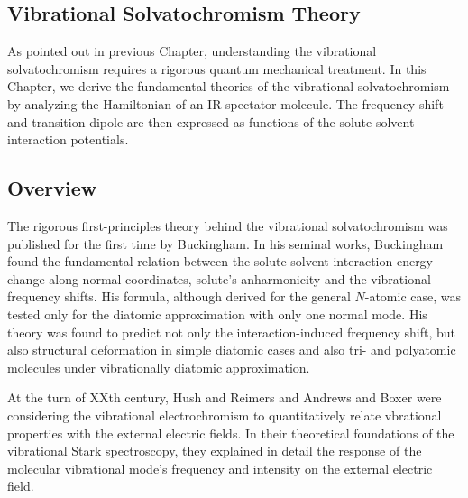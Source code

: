 \documentclass[a4paper,titlepage,twoside,fleqn,12pt]{book}
\begin{document}
\begin{refsection}
\chapter{Vibrational Solvatochromism Theory\label{c:background}}

As pointed out in previous Chapter, understanding the vibrational
solvatochromism requires a rigorous quantum mechanical treatment.
In this Chapter, we derive the fundamental theories of the vibrational
solvatochromism by analyzing the Hamiltonian of an IR spectator molecule.
The frequency shift and transition dipole are then expressed as functions
of the solute\hyp{}solvent interaction potentials.

\section{Overview\label{s:theory}}

The rigorous first\hyp{}principles theory behind the vibrational solvatochromism was published
for the first time by Buckingham.\citep{Buckingham.ProcRSocLondonA.1958,
Buckingham.TransFaradaySoc.1960,Buckingham.ProcRSocLondonA.1960} 
In his seminal works, Buckingham found the fundamental 
relation between the solute\hyp{}solvent interaction energy change along normal 
coordinates, solute's anharmonicity and the vibrational frequency shifts.
His formula, although derived for the general $N$-atomic case, was tested
only for the diatomic approximation with only one normal mode. 
His theory was found to predict not only
the interaction\hyp{}induced frequency shift, but also structural deformation in simple
diatomic cases \citep{McDowell.Buckingham.MolPhys.2005,McDowell.Buckingham.JACS.2005,
McDowell.Buckingham.SpectrChimActaA.2005,Buckingham.CPL.2008} 
and also tri- and polyatomic molecules under 
vibrationally diatomic approximation.\citep{McDowell.Buckingham.SpectrChimActaA.2005,
Buckingham.CPL.2008,Herrebout.Delanoye.vanderVeken.JPCA.2004}

At the turn of XXth century, Hush and Reimers\citep{Hush.Reimers.JPC.1995,Reimers.Zeng.Hush.JPC.1996} 
and Andrews and Boxer\citep{Andrews.Boxer.JCPA.2002,Andrews.Boxer.JCPA.2000} 
were considering the vibrational electrochromism
to quantitatively relate vbrational properties with the external electric fields.
In their theoretical foundations of the vibrational Stark spectroscopy,
they explained in detail the response of the molecular vibrational mode's frequency
and intensity
on the external electric field. 


\end{refsection}
\end{document}
